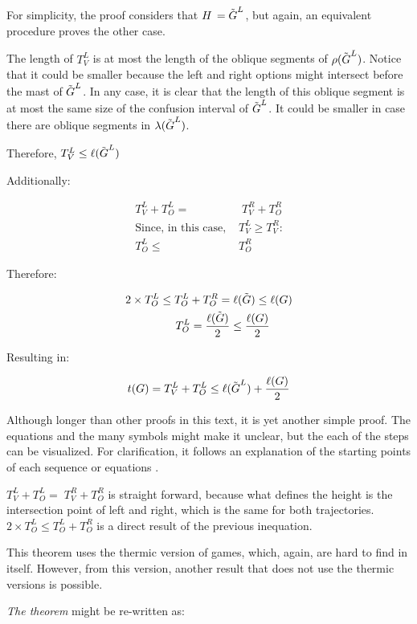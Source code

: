 For simplicity, the proof considers that $\mbox{$H\,$} = \tilde{\mbox{$G$}}^L$, but again, an equivalent procedure proves the other case.

The length of $T^L_V$ is at most the length of the oblique segments of $\rho(\tilde{\mbox{$G$}}^L)$. Notice that it could be smaller because the left and right options might intersect before the mast of $\tilde{\mbox{$G$}}^L$. In any case, it is clear that the length of this oblique segment is at most the same size of the confusion interval of $\tilde{\mbox{$G$}}^L$. It could be smaller in case there are oblique segments in $\lambda(\tilde{\mbox{$G$}}^L)$.

Therefore, $T^L_V \leq \ell(\tilde{\mbox{$G$}}^L)$

Additionally:

\begin{align*}
T^L_V + T^L_O =&\;T^R_V+T^R_O\\
\text{Since, in this case, }& T^L_V \ge T^R_V\text{:}\\
T^L_O \leq&T^R_O
\end{align*}

Therefore:

\begin{align*}
	2\times T^L_O \leq T^L_O + T^R_O =&\;\ell(\tilde{\mbox{$G$}}) \leq \ell(\mbox{$G$})\\
	T^L_O = \frac{\ell(\tilde{\mbox{$G$}})}{2} &\leq \frac{\ell(\mbox{$G$})}{2}
\end{align*}

Resulting in:

$$
t(G) = T^L_V + T^L_O \leq \ell(\tilde{\mbox{$G$}}^L) + \frac{\ell(G)}{2}
$$

Although longer than other proofs in this text, it is yet another simple proof. The equations and the many symbols might make it unclear, but the each of the steps can be visualized. For clarification, it follows an explanation of the starting points of each sequence or equations .

$T^L_V + T^L_O =\;T^R_V+T^R_O$ is straight forward, because what defines the height is the intersection point of left and right, which is the same for both trajectories. $2\times T^L_O \leq T^L_O + T^R_O$ is a direct result of the previous inequation. 

This theorem uses the thermic version of games, which, again, are hard to find in itself. However, from this version, another result that does not use the thermic versions is possible.

\textit{The theorem} might be re-written as:

